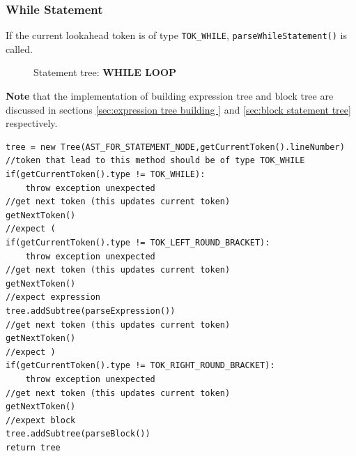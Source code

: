 \subsubsection{While Statement}
If the current lookahead token is of type \verb!TOK_WHILE!, \verb!parseWhileStatement()! is called. 
\begin{figure}[H]
    \centering
    \caption{Statement tree: \textbf{WHILE LOOP}}
    \label{fig:while statement tree}
\end{figure}
\textbf{Note } that the implementation of building  expression tree and block tree are discussed in sections \ref{sec:expression tree building } and \ref{sec:block statement tree}  respectively.
\begin{lstlisting}[caption=PSEUDOCODE for building a while statement subtree (\emph{parseWhileStatement()})]
tree = new Tree(AST_FOR_STATEMENT_NODE,getCurrentToken().lineNumber)
//token that lead to this method should be of type TOK_WHILE
if(getCurrentToken().type != TOK_WHILE):
    throw exception unexpected 
//get next token (this updates current token)
getNextToken()
//expect (
if(getCurrentToken().type != TOK_LEFT_ROUND_BRACKET):
    throw exception unexpected 
//get next token (this updates current token)
getNextToken()
//expect expression
tree.addSubtree(parseExpression())
//get next token (this updates current token)
getNextToken()
//expect )
if(getCurrentToken().type != TOK_RIGHT_ROUND_BRACKET):
    throw exception unexpected 
//get next token (this updates current token)
getNextToken()
//expext block 
tree.addSubtree(parseBlock())
return tree
\end{lstlisting}

